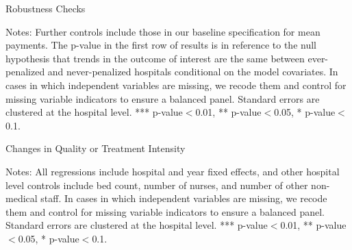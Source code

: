 \documentclass[12pt]{article}
\begin{document}
\setlength{\captionmargin}{.5 \textwidth} \addtolength{\captionmargin}{-.5\wd\gfxbox}
\begin{table}[htbp!]
\centering
\caption{Robustness Checks}
\label{tab:robustness}
\usebox{\gfxbox}
\par
\begin{minipage}{\wd\gfxbox}
\footnotesize
Notes: Further controls include those in our baseline specification for mean payments.  The p-value in the first row of results is in reference to the null hypothesis that trends in the outcome of interest are the same between ever-penalized and never-penalized hospitals conditional on the model covariates.  In cases in which independent variables are missing, we recode them and control for missing variable indicators to ensure a balanced panel.  Standard errors are clustered at the hospital level.   *** p-value$<$0.01, ** p-value$<$0.05, * p-value$<$0.1.
\end{minipage}
\end{table}


\newpage
{}
\setlength{\captionmargin}{.5 \textwidth} \addtolength{\captionmargin}{-.5\wd\gfxbox}
\begin{table}[htbp!]
\centering
\caption{Changes in Quality or Treatment Intensity}
\label{tab:other_results}
\usebox{\gfxbox}
\par
\begin{minipage}{\wd\gfxbox}
\footnotesize
Notes: All regressions include hospital and year fixed effects, and other hospital level controls include bed count, number of nurses, and number of other non-medical staff. In cases in which independent variables are missing, we recode them and control for missing variable indicators to ensure a balanced panel.  Standard errors are clustered at the hospital level.   *** p-value$<$0.01, ** p-value$<$0.05, * p-value$<$0.1.
\end{minipage}
\end{table}
\end{document}
